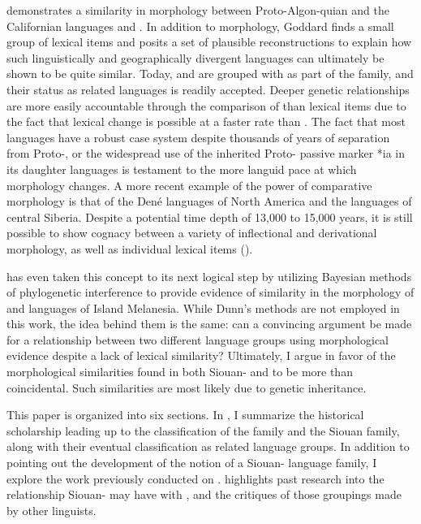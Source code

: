 \documentclass[output=paper]{LSP/langsci}
\begin{document}
\citet{Goddard1975} demonstrates a similarity in morphology between Proto-Algon-quian and the Californian languages  and . In addition to morphology, Goddard finds a small group of lexical items and posits a set of plausible reconstructions to explain how such linguistically and geographically divergent languages can ultimately be shown to be quite similar. Today,  and  are grouped with  as part of the  family, and their status as related languages is readily accepted. Deeper genetic relationships are more easily accountable through the comparison of  than lexical items due to the fact that lexical change is possible at a faster rate than . The fact that most  languages have a robust case system despite thousands of years of separation from Proto-, or the widespread use of the inherited Proto- passive marker *ia in its daughter languages is testament to the more languid pace at which morphology changes. A more recent example of the power of comparative morphology is that of the Den\'e languages of North America and the  languages of central Siberia. Despite a potential time depth of 13,000 to 15,000 years, it is still possible to show cognacy between a variety of inflectional and derivational morphology, as well as individual lexical items (\citealt{Vajda2010}).

\citet{Dunn2009} has even taken this concept to its next logical step by utilizing Bayesian methods of phylogenetic interference to provide evidence of similarity in the morphology of  and  languages of Island Melanesia. While Dunn's methods are not employed in this work, the idea behind them is the same: can a convincing argument be made for a relationship between two different language groups using morphological evidence despite a lack of lexical similarity? Ultimately, I argue in favor of the morphological similarities found in both Siouan- and  to be more than coincidental. Such similarities are most likely due to genetic inheritance.

This paper is organized into six sections. In , I summarize the historical scholarship leading up to the classification of the  family and the Siouan family, along with their eventual classification as related language groups. In addition to pointing out the development of the notion of a Siouan- language family, I explore the work previously conducted on .  highlights past research into the relationship Siouan- may have with , and the critiques of those groupings made by other linguists. 
\end{document}
